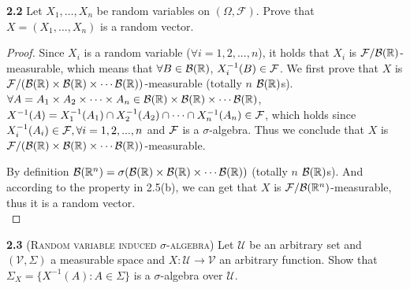 
\noindent\textbf{2.2} 
Let $X_1,\dots,X_n$ be random variables on $(\Omega, \mathcal{F})$. Prove that $X=( X_1 ,\dots,X_n )$ is a random vector.
\begin{proof}
    Since $X_i$ is a random variable ($\forall i=1,2,...,n$), it holds that $X_i$ is $\mathcal{F}/\mathcal{B}(\mathbb{R})$-measurable, which means that $\forall B \in \mathcal{B}(\mathbb{R})$, $X_i^{-1}(B) \in \mathcal{F}$. 
    We first prove that $X$ is $\mathcal{F}/(\mathcal{B}(\mathbb{R}) \times \mathcal{B}(\mathbb{R})\times\cdots \mathcal{B}(\mathbb{R}) )$-measurable (totally $n$ $\mathcal{B}(\mathbb{R})$s). $\forall A=A_1\times A_2 \times \cdots \times A_n  \in \mathcal{B}(\mathbb{R}) \times \mathcal{B}(\mathbb{R})\times\cdots \mathcal{B}(\mathbb{R})$, $X^{-1}(A) =X_1^{-1}(A_1) \cap X_2^{-1}(A_2) \cap \cdots \cap X_n^{-1}(A_n) \in \mathcal{F}$, which holds since $X_i^{-1}(A_i) \in \mathcal{F}, \forall i =1,2,...,n$ and $\mathcal{F}$ is a $\sigma$-algebra. Thus we conclude that $X$ is $\mathcal{F}/(\mathcal{B}(\mathbb{R}) \times \mathcal{B}(\mathbb{R})\times\cdots \mathcal{B}(\mathbb{R}) )$-measurable.

    By definition $\mathcal{B}(\mathbb{R}^n) = \sigma (\mathcal{B}(\mathbb{R}) \times \mathcal{B}(\mathbb{R})\times\cdots \mathcal{B}(\mathbb{R}))$ (totally $n$ $\mathcal{B}(\mathbb{R})$s). And according to the property in 2.5(b), we can get that $X$ is $\mathcal{F}/\mathcal{B}(\mathbb{R}^n)$-measurable, thus it is a random vector.\\
\end{proof}


\noindent\textbf{2.3}
(\textsc{Random variable induced $\sigma$-algebra}) Let $\mathcal{U}$ be an arbitrary set and
$( \mathcal{V}, \Sigma)$ a measurable space and $X : \mathcal{U} \rightarrow \mathcal{V}$ an arbitrary function. Show that
$\Sigma_X = \{X ^{-1} (A) : A \in \Sigma\}$ is a $\sigma$-algebra over $\mathcal{U}$.

